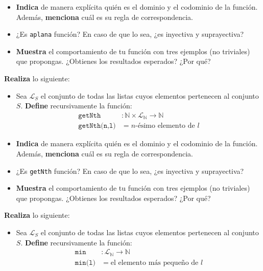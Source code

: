 \documentclass[oneside]{style}
\begin{document}
\begin{questions}[label=\protect\circled{\bfseries\arabic*}]
{\begin{itemize}
            \item \textbf{Indica} de manera explícita quién es el dominio y el 
            codominio de la función. Además, \textbf{menciona} cuál es su regla 
            de correspondencia.

            \item ¿Es \texttt{aplana} función? En caso de que lo sea, ¿es 
            inyectiva y suprayectiva?

            \item \textbf{Muestra} el comportamiento de tu función con tres 
            ejemplos (no triviales) que propongas. ¿Obtienes los resultados 
            esperados? ¿Por qué?
        \end{itemize}
    }

    \question
    {
        \textbf{Realiza} lo siguiente:
        \begin{itemize}
            \item Sea $\mathcal{L}_S$  el conjunto de todas las listas 
            cuyos elementos pertenecen al conjunto $S$. \textbf{Define} 
            recursivamente la función:
            \begin{align*}
                \texttt{getNth}&: \mathbb{N} \times \mathcal{L}_\mathbb{N} 
                \rightarrow \mathbb{N} \\ 
                \texttt{getNth(n,l)} &= n\text{-ésimo elemento de } l
            \end{align*}

            \item \textbf{Indica} de manera explícita quién es el dominio y el 
            codominio de la función. Además, \textbf{menciona} cuál es su regla 
            de correspondencia.

            \item ¿Es \texttt{getNth} función? En caso de que lo sea, ¿es 
            inyectiva y suprayectiva?

            \item \textbf{Muestra} el comportamiento de tu función con tres 
            ejemplos (no triviales) que propongas. ¿Obtienes los resultados 
            esperados? ¿Por qué?
        \end{itemize}
    }

    \question
    {
        \textbf{Realiza} lo siguiente:
        \begin{itemize}
            \item Sea $\mathcal{L}_S$  el conjunto de todas las listas 
            cuyos elementos pertenecen al conjunto $S$. \textbf{Define} 
            recursivamente la función:
            \begin{align*}
                \texttt{min}&: \mathcal{L}_\mathbb{N} 
                \rightarrow \mathbb{N} \\ 
                \texttt{min(l)} &= \text{el elemento más pequeño de } l
            \end{align*}


\end{itemize}}
\end{questions}
\end{document}
